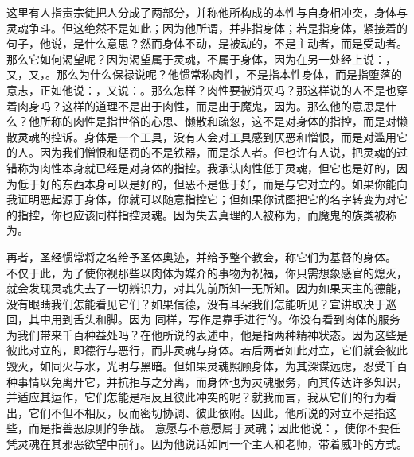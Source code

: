 这里有人指责宗徒把人分成了两部分，并称他所构成的本性与自身相冲突，身体与灵魂争斗。但这绝然不是如此；因为他所谓，并非指身体；若是指身体，紧接着的句子，他说，是什么意思？然而身体不动，是被动的，不是主动者，而是受动者。那么它如何渴望呢？因为渴望属于灵魂，不属于身体，因为在另一处经上说：，又，又，。那么为什么保禄说呢？他惯常称肉性，不是指本性身体，而是指堕落的意志，正如他说：，又说：。那么怎样？肉性要被消灭吗？那这样说的人不是也穿着肉身吗？这样的道理不是出于肉性，而是出于魔鬼，因为。那么他的意思是什么？他所称的肉性是指世俗的心思、懒散和疏忽，这不是对身体的指控，而是对懒散灵魂的控诉。身体是一个工具，没有人会对工具感到厌恶和憎恨，而是对滥用它的人。因为我们憎恨和惩罚的不是铁器，而是杀人者。但也许有人说，把灵魂的过错称为肉性本身就已经是对身体的指控。我承认肉性低于灵魂，但它也是好的，因为低于好的东西本身可以是好的，但恶不是低于好，而是与它对立的。如果你能向我证明恶起源于身体，你就可以随意指控它；但如果你试图把它的名字转变为对它的指控，你也应该同样指控灵魂。因为失去真理的人被称为，而魔鬼的族类被称为。\par

再者，圣经惯常将之名给予圣体奥迹，并给予整个教会，称它们为基督的身体。 不仅于此，为了使你视那些以肉体为媒介的事物为祝福，你只需想象感官的熄灭，就会发现灵魂失去了一切辨识力，对其先前所知一无所知。因为如果天主的德能，没有眼睛我们怎能看见它们？如果信德，没有耳朵我们怎能听见？宣讲取决于巡回，其中用到舌头和脚。因为 同样，写作是靠手进行的。你没有看到肉体的服务为我们带来千百种益处吗？在他所说的表述中，他是指两种精神状态。因为这些是彼此对立的，即德行与恶行，而非灵魂与身体。若后两者如此对立，它们就会彼此毁灭，如同火与水，光明与黑暗。但如果灵魂照顾身体，为其深谋远虑，忍受千百种事情以免离开它，并抗拒与之分离，而身体也为灵魂服务，向其传达许多知识，并适应其运作，它们怎能是相反且彼此冲突的呢？就我而言，我从它们的行为看出，它们不但不相反，反而密切协调、彼此依附。因此，他所说的对立不是指这些，而是指善恶原则的争战。 意愿与不意愿属于灵魂；因此他说：，使你不要任凭灵魂在其邪恶欲望中前行。因为他说话如同一个主人和老师，带着威吓的方式。\par

